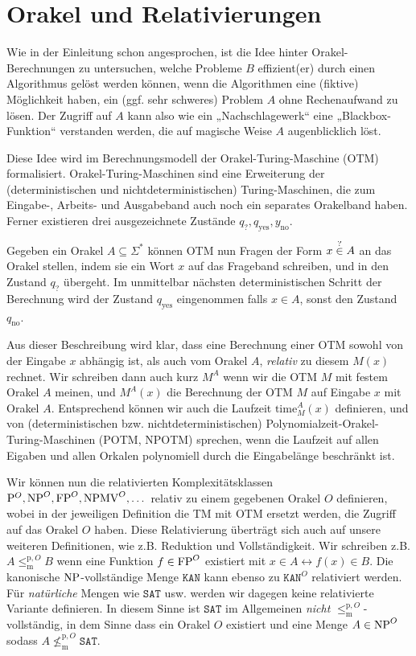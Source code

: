 \section{Orakel und Relativierungen}\label{sec:prelim-orakel}

Wie in der Einleitung schon angesprochen, ist die Idee hinter Orakel-Berechnungen zu untersuchen, welche Probleme $B$ effizient(er) durch einen Algorithmus gelöst werden können, wenn die Algorithmen eine (fiktive) Möglichkeit haben, ein (ggf. sehr schweres) Problem $A$ ohne Rechenaufwand zu lösen.
Der Zugriff auf $A$ kann also wie ein „Nachschlagewerk“ eine „Blackbox-Funktion“ verstanden werden, die auf magische Weise $A$ augenblicklich löst.

Diese Idee wird im Berechnungsmodell der Orakel-Turing-Maschine (OTM) formalisiert. Orakel-Turing-Maschinen sind eine Erweiterung der (deterministischen und nichtdeterministischen) Turing-Maschinen, die zum Eingabe-, Arbeits- und Ausgabeband auch noch ein separates Orakelband haben. Ferner existieren drei ausgezeichnete Zustände $q_?, q_\text{yes}, y_\text{no}$.

Gegeben ein Orakel $A\subseteq\Sigma^*$ können OTM nun Fragen der Form $x\stackrel{\smash ?}{\in} A$ an das Orakel stellen, indem sie ein Wort $x$ auf das Frageband schreiben, und in den Zustand $q_?$ übergeht. Im unmittelbar nächsten deterministischen Schritt der Berechnung wird der Zustand $q_\text{yes}$ eingenommen falls $x\in A$, sonst den Zustand $q_\text{no}$.

Aus dieser Beschreibung wird klar, dass eine Berechnung einer OTM sowohl von der Eingabe $x$ abhängig ist, als auch vom Orakel $A$, \emph{relativ} zu diesem $M(x)$ rechnet. Wir schreiben dann auch kurz $M^A$ wenn wir die OTM $M$ mit festem Orakel $A$ meinen, und $M^A(x)$ die Berechnung der OTM $M$ auf Eingabe $x$ mit Orakel $A$. Entsprechend können wir auch die Laufzeit $\mathrm{time}_M^A(x)$ definieren, und von (deterministischen bzw. nichtdeterministischen) Polynomialzeit-Orakel-Turing-Maschinen (POTM, NPOTM) sprechen, wenn die Laufzeit auf allen Eigaben und allen Orkalen polynomiell durch die Eingabelänge beschränkt ist.

Wir können nun die relativierten Komplexitätsklassen $\mathrm{P}^O, \mathrm{NP}^O, \mathrm{FP}^O, \mathrm{NPMV}^O, \dots$ relativ zu einem gegebenen Orakel $O$ definieren, wobei in der jeweiligen Definition die TM mit OTM ersetzt werden, die Zugriff auf das Orakel $O$ haben.
Diese Relativierung überträgt sich auch auf unsere weiteren Definitionen, wie z.B. Reduktion und Vollständigkeit. Wir schreiben z.B. $A\leq_\mathrm{m}^{\mathrm{p},O} B$ wenn eine Funktion $f\in\mathrm{FP}^O$ existiert mit $x\in A \leftrightarrow f(x)\in B$.
Die kanonische $\mathrm{NP}$-vollständige Menge $\mathtt{KAN}$ kann ebenso zu $\mathtt{KAN}^O$ relativiert werden.
Für \emph{natürliche} Mengen wie $\mathtt{SAT}$ usw. werden wir dagegen keine relativierte Variante definieren. In diesem Sinne ist $\mathtt{SAT}$ im Allgemeinen \emph{nicht} $\leq_\mathrm{m}^{\mathrm{p},O}$-vollständig, in dem Sinne dass ein Orakel $O$ existiert und eine Menge $A\in\mathrm{NP}^O$ sodass $A\not\leq_\mathrm{m}^{\mathrm{p},O} \mathtt{SAT}$.


